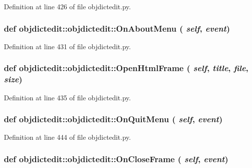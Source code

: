 Definition at line 426 of file objdictedit.py.\hypertarget{classobjdictedit_1_1objdictedit_a660005de7e719ce7396beeea0ece661}{
\subsubsection[OnAboutMenu]{\setlength{\rightskip}{0pt plus 5cm}def objdictedit::objdictedit::On\-About\-Menu ( {\em self},  {\em event})}}
\label{classobjdictedit_1_1objdictedit_a660005de7e719ce7396beeea0ece661}




Definition at line 431 of file objdictedit.py.\hypertarget{classobjdictedit_1_1objdictedit_3779119b638995bf42810727e9562bec}{
\subsubsection[OpenHtmlFrame]{\setlength{\rightskip}{0pt plus 5cm}def objdictedit::objdictedit::Open\-Html\-Frame ( {\em self},  {\em title},  {\em file},  {\em size})}}
\label{classobjdictedit_1_1objdictedit_3779119b638995bf42810727e9562bec}




Definition at line 435 of file objdictedit.py.\hypertarget{classobjdictedit_1_1objdictedit_bb517a0b8fd0e43f1a1d68c7ce372ac3}{
\subsubsection[OnQuitMenu]{\setlength{\rightskip}{0pt plus 5cm}def objdictedit::objdictedit::On\-Quit\-Menu ( {\em self},  {\em event})}}
\label{classobjdictedit_1_1objdictedit_bb517a0b8fd0e43f1a1d68c7ce372ac3}




Definition at line 444 of file objdictedit.py.\hypertarget{classobjdictedit_1_1objdictedit_ef6f7560bf9be52aa312833771cfb3c9}{
\subsubsection[OnCloseFrame]{\setlength{\rightskip}{0pt plus 5cm}def objdictedit::objdictedit::On\-Close\-Frame ( {\em self},  {\em event})}}
\label{classobjdictedit_1_1objdictedit_ef6f7560bf9be52aa312833771cfb3c9}




